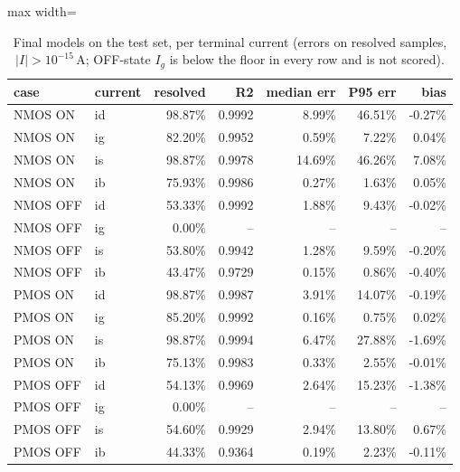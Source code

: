 \begin{table}[H]
\centering
{\small
\begin{adjustbox}{max width=\linewidth}
\begin{tabular}{llrrrrr}
\toprule
case & current & resolved & R2 & median err & P95 err & bias \\
\midrule
NMOS ON & id & 98.87\% & 0.9992 & 8.99\% & 46.51\% & -0.27\% \\
NMOS ON & ig & 82.20\% & 0.9952 & 0.59\% & 7.22\% & 0.04\% \\
NMOS ON & is & 98.87\% & 0.9978 & 14.69\% & 46.26\% & 7.08\% \\
NMOS ON & ib & 75.93\% & 0.9986 & 0.27\% & 1.63\% & 0.05\% \\
NMOS OFF & id & 53.33\% & 0.9992 & 1.88\% & 9.43\% & -0.02\% \\
NMOS OFF & ig & 0.00\% & -- & -- & -- & -- \\
NMOS OFF & is & 53.80\% & 0.9942 & 1.28\% & 9.59\% & -0.20\% \\
NMOS OFF & ib & 43.47\% & 0.9729 & 0.15\% & 0.86\% & -0.40\% \\
PMOS ON & id & 98.87\% & 0.9987 & 3.91\% & 14.07\% & -0.19\% \\
PMOS ON & ig & 85.20\% & 0.9992 & 0.16\% & 0.75\% & 0.02\% \\
PMOS ON & is & 98.87\% & 0.9994 & 6.47\% & 27.88\% & -1.69\% \\
PMOS ON & ib & 75.13\% & 0.9983 & 0.33\% & 2.55\% & -0.01\% \\
PMOS OFF & id & 54.13\% & 0.9969 & 2.64\% & 15.23\% & -1.38\% \\
PMOS OFF & ig & 0.00\% & -- & -- & -- & -- \\
PMOS OFF & is & 54.60\% & 0.9929 & 2.94\% & 13.80\% & 0.67\% \\
PMOS OFF & ib & 44.33\% & 0.9364 & 0.19\% & 2.23\% & -0.11\% \\
\bottomrule
\end{tabular}
\end{adjustbox}
}
\caption{Final models on the test set, per terminal current (errors on resolved samples, $|I|>10^{-15}$\,A; OFF-state $I_g$ is below the floor in every row and is not scored).}
\label{tab:chosen}
\end{table}


